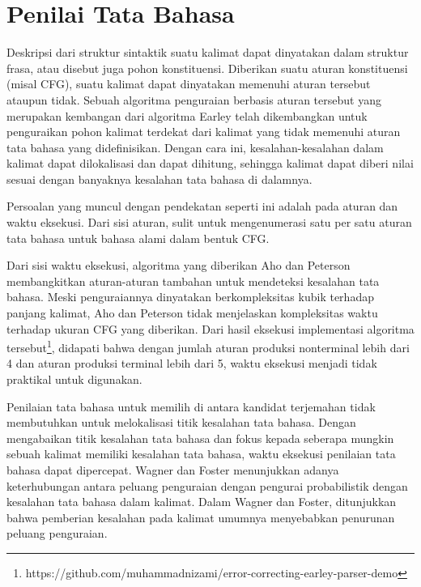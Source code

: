 \documentclass[conference]{IEEEtran}
\begin{document}
\section{Penilai Tata Bahasa}

Deskripsi dari struktur sintaktik suatu kalimat dapat dinyatakan dalam struktur frasa, atau disebut juga pohon konstituensi. Diberikan suatu aturan konstituensi (misal CFG), suatu kalimat dapat dinyatakan memenuhi aturan tersebut ataupun tidak\cite{b1}. Sebuah algoritma penguraian berbasis aturan tersebut \cite{b2} yang merupakan kembangan dari algoritma Earley \cite{b3} telah dikembangkan untuk penguraikan pohon kalimat terdekat dari kalimat yang tidak memenuhi aturan tata bahasa yang didefinisikan. Dengan cara ini, kesalahan-kesalahan dalam kalimat dapat dilokalisasi dan dapat dihitung, sehingga kalimat dapat diberi nilai sesuai dengan banyaknya kesalahan tata bahasa di dalamnya.

Persoalan yang muncul dengan pendekatan seperti ini adalah pada aturan dan waktu eksekusi. Dari sisi aturan, sulit untuk mengenumerasi satu per satu aturan tata bahasa untuk bahasa alami dalam bentuk CFG.

Dari sisi waktu eksekusi, algoritma yang diberikan Aho dan Peterson \cite{b2} membangkitkan aturan-aturan tambahan untuk mendeteksi kesalahan tata bahasa. Meski penguraiannya dinyatakan berkompleksitas kubik terhadap panjang kalimat, Aho dan Peterson tidak menjelaskan kompleksitas waktu terhadap ukuran CFG yang diberikan. Dari hasil eksekusi implementasi algoritma tersebut\footnote{https://github.com/muhammadnizami/error-correcting-earley-parser-demo}, didapati bahwa dengan jumlah aturan produksi nonterminal lebih dari 4 dan aturan produksi terminal lebih dari 5, waktu eksekusi menjadi tidak praktikal untuk digunakan.

Penilaian tata bahasa untuk memilih di antara kandidat terjemahan tidak membutuhkan untuk melokalisasi titik kesalahan tata bahasa. Dengan mengabaikan titik kesalahan tata bahasa dan fokus kepada seberapa mungkin sebuah kalimat memiliki kesalahan tata bahasa, waktu eksekusi penilaian tata bahasa dapat dipercepat. Wagner dan Foster \cite{b4} menunjukkan adanya keterhubungan antara peluang penguraian dengan pengurai probabilistik dengan kesalahan tata bahasa dalam kalimat. Dalam Wagner dan Foster\cite{b4}, ditunjukkan bahwa pemberian kesalahan pada kalimat umumnya menyebabkan penurunan peluang penguraian.
\end{document}
